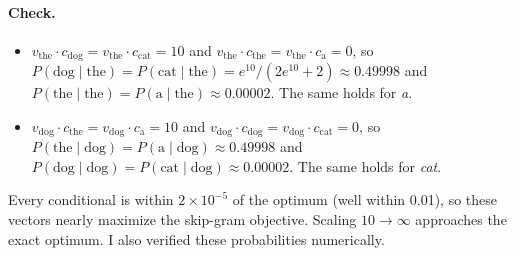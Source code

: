 \documentclass[10pt]{article}
\begin{document}
\paragraph{Check.}
\begin{itemize}
  \item $v_{\text{the}} \cdot c_{\text{dog}} = v_{\text{the}} \cdot c_{\text{cat}} = 10$ and
        $v_{\text{the}} \cdot c_{\text{the}} = v_{\text{the}} \cdot c_{\text{a}} = 0$, so
        $P(\text{dog} \mid \text{the}) = P(\text{cat} \mid \text{the}) = e^{10} / (2e^{10} + 2) \approx 0.49998$
        and $P(\text{the} \mid \text{the}) = P(\text{a} \mid \text{the}) \approx 0.00002$. The same holds for
        \emph{a}.
  \item $v_{\text{dog}} \cdot c_{\text{the}} = v_{\text{dog}} \cdot c_{\text{a}} = 10$ and
        $v_{\text{dog}} \cdot c_{\text{dog}} = v_{\text{dog}} \cdot c_{\text{cat}} = 0$, so
        $P(\text{the} \mid \text{dog}) = P(\text{a} \mid \text{dog}) \approx 0.49998$ and
        $P(\text{dog} \mid \text{dog}) = P(\text{cat} \mid \text{dog}) \approx 0.00002$. The same holds for
        \emph{cat}.
\end{itemize}

Every conditional is within $2 \times 10^{-5}$ of the optimum (well within 0.01), so these vectors nearly maximize
the skip-gram objective. Scaling $10 \to \infty$ approaches the exact optimum. I also verified these probabilities
numerically.
\end{document}
